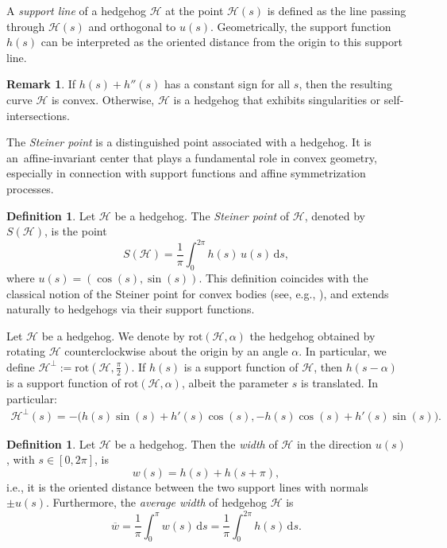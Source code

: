 \documentclass{amsart}
\theoremstyle{definition}
\newtheorem{defn}[thm]{Definition}
\newtheorem{rem}[thm]{Remark}
\numberwithin{equation}{section}
\renewcommand{\d}{\mathrm{d}}
\newcommand{\rot}{\mathrm{rot}}
\begin{document}
A \textit{support line} of a hedgehog $\mathcal{H}$ at the point $\mathcal{H}(s)$ is defined as the line passing through $\mathcal{H}(s)$ and orthogonal to $u(s)$. Geometrically, the support function $h(s)$ can be interpreted as the oriented distance from the origin to this support line.

\begin{rem}
If $h(s)+h''(s)$ has a constant sign for all $s$, then the resulting curve $\mathcal{H}$ is convex. Otherwise, $\mathcal{H}$ is a hedgehog that exhibits singularities or self-intersections.
\end{rem}

The \textit{Steiner point} is a distinguished point associated with a hedgehog. It is an~affine-invariant center that plays a fundamental role in convex geometry, especially in connection with support functions and affine symmetrization processes.

\begin{defn}
Let $\mathcal{H}$ be a hedgehog. The \textit{Steiner point} of $\mathcal{H}$, denoted by $S(\mathcal{H})$, is the point
\[
S(\mathcal{H}) = \frac{1}{\pi} \int_0^{2\pi} h(s) \, u(s) \, \d s,
\]
where $u(s) = (\cos (s), \sin (s))$. This definition coincides with the classical notion of the Steiner point for convex bodies (see, e.g., \cite{SchneiderBook}), and extends naturally to hedgehogs via their support functions.
\end{defn}

Let $\mathcal{H}$ be a hedgehog. We denote by $\rot(\mathcal{H}, \alpha)$ the hedgehog obtained by rotating $\mathcal{H}$ counterclockwise about the origin by an angle $\alpha$. In particular, we define $\mathcal{H}^{\perp}:=\rot\left(\mathcal{H},\frac{\pi}{2}\right)$. If $h(s)$ is a support function of $\mathcal{H}$, then $h(s-\alpha)$ is a support function of $\rot\left(\mathcal{H},\alpha\right)$, albeit the parameter $s$ is translated. In particular:
\begin{align}
    \label{param}\mathcal{H}^\perp(s) = -\Big( h(s) \sin(s) + h'(s) \cos(s),  -h(s) \cos(s) + h'(s) \sin(s) \Big).
\end{align}

\begin{defn}
    Let $\mathcal{H}$ be a hedgehog. Then the \textit{width} of $\mathcal{H}$ in the direction $u(s)$, with $s\in[0,2\pi]$, is
    $$w(s) = h(s)+h(s+\pi),$$
    i.e., it is the oriented distance between the two support lines with normals $\pm u(s)$.
    Furthermore, the \textit{average width} of hedgehog $\mathcal{H}$ is
    $$\overline{w} = \frac{1}{\pi}\int_0^{\pi}w(s)\,\d s=\frac{1}{\pi}\int_0^{2\pi}h(s)\,\d s.$$
\end{defn}
\end{document}
